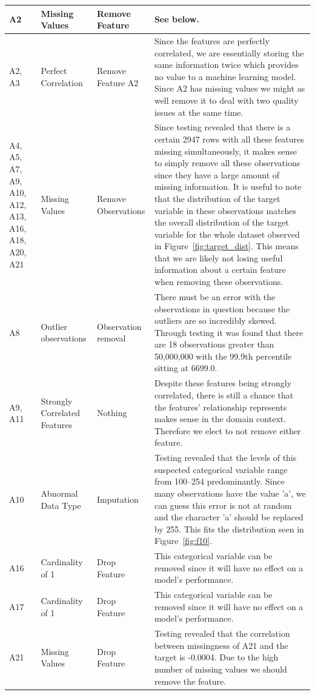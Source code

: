 \documentclass[11pt]{article}
\begin{document}
\begin{longtable}{|p{1.7cm}|l|p{3cm}|p{6cm}|}
	\hline
	\endlastfoot
	A2 & Missing Values & Remove Feature & See below. \\ \hline
	A2, A3 & Perfect Correlation & Remove Feature A2 & Since the features are perfectly correlated, we are essentially storing the same information twice which provides no value to a machine learning model. Since A2 has missing values we might as well remove it to deal with two quality issues at the same time. \\ \hline
	A4, A5, A7, A9, A10, A12, A13, A16, A18, A20, A21 & Missing Values & Remove Observations & Since testing revealed that there is a certain 2947 rows with all these features missing simultaneously, it makes sense to simply remove all these observations since they have a large amount of missing information. It is useful to note that the distribution of the target variable in these observations matches the overall distribution of the target variable for the whole dataset observed in Figure~\ref{fig:target_dist}. This means that we are likely not losing useful information about a certain feature when removing these observations.  \\ \hline
	A8 & Outlier observations & Observation removal & There must be an error with the observations in question because the outliers are so incredibly skewed. Through testing it was found that there are 18 observations greater than 50,000,000 with the 99.9th percentile sitting at 6699.0. \\ \hline
	A9, A11 & Strongly Correlated Features & Nothing & Despite these features being strongly correlated, there is still a chance that the features' relationship represents makes sense in the domain context. Therefore we elect to not remove either feature.\\ \hline
	A10 & Abnormal Data Type & Imputation & Testing revealed that the levels of this suspected categorical variable range from 100–254 predominantly. Since many observations have the value 'a', we can guess this error is not at random and the character 'a' should be replaced by 255. This fits the distribution seen in Figure~\ref{fig:f10}. \\ \hline
	A16 & Cardinality of 1 & Drop Feature & This categorical variable can be removed since it will have no effect on a model's performance. \\ \hline
	A17 & Cardinality of 1 & Drop Feature & This categorical variable can be removed since it will have no effect on a model's performance. \\ \hline
	A21 & Missing Values & Drop Feature & Testing revealed that the correlation between missingness of A21 and the target is -0.0004. Due to the high number of missing values we should remove the feature. \\ \hline

\end{longtable}
\end{document}
